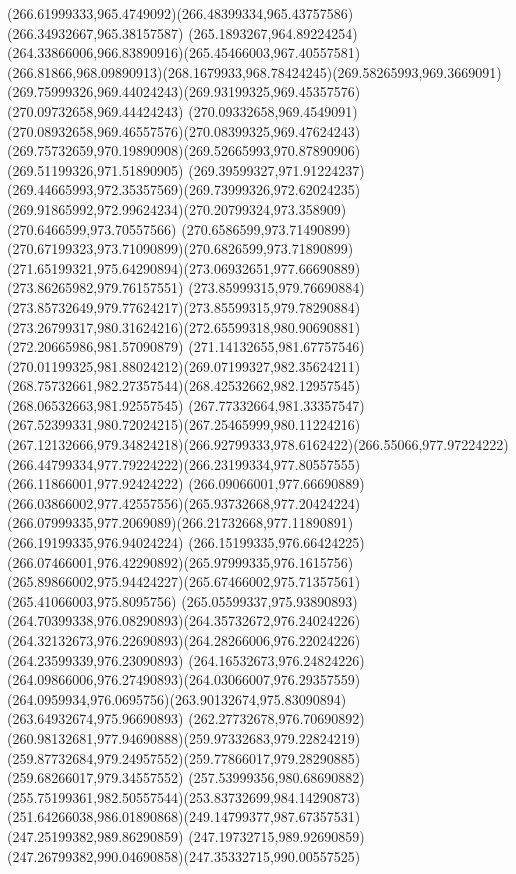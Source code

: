 {{\curveto(266.61999333,965.4749092)(266.48399334,965.43757586)(266.34932667,965.38157587)
\curveto(265.1893267,964.89224254)(264.33866006,966.83890916)(265.45466003,967.40557581)
\curveto(266.81866,968.09890913)(268.1679933,968.78424245)(269.58265993,969.3669091)
\curveto(269.75999326,969.44024243)(269.93199325,969.45357576)(270.09732658,969.44424243)
\curveto(270.09332658,969.4549091)(270.08932658,969.46557576)(270.08399325,969.47624243)
\curveto(269.75732659,970.19890908)(269.52665993,970.87890906)(269.51199326,971.51890905)
\curveto(269.39599327,971.91224237)(269.44665993,972.35357569)(269.73999326,972.62024235)
\curveto(269.91865992,972.99624234)(270.20799324,973.358909)(270.6466599,973.70557566)
\curveto(270.6586599,973.71490899)(270.67199323,973.71090899)(270.6826599,973.71890899)
\curveto(271.65199321,975.64290894)(273.06932651,977.66690889)(273.86265982,979.76157551)
\curveto(273.85999315,979.76690884)(273.85732649,979.77624217)(273.85599315,979.78290884)
\curveto(273.26799317,980.31624216)(272.65599318,980.90690881)(272.20665986,981.57090879)
\curveto(271.14132655,981.67757546)(270.01199325,981.88024212)(269.07199327,982.35624211)
\curveto(268.75732661,982.27357544)(268.42532662,982.12957545)(268.06532663,981.92557545)
\curveto(267.77332664,981.33357547)(267.52399331,980.72024215)(267.25465999,980.11224216)
\curveto(267.12132666,979.34824218)(266.92799333,978.6162422)(266.55066,977.97224222)
\curveto(266.44799334,977.79224222)(266.23199334,977.80557555)(266.11866001,977.92424222)
\curveto(266.09066001,977.66690889)(266.03866002,977.42557556)(265.93732668,977.20424224)
\curveto(266.07999335,977.2069089)(266.21732668,977.11890891)(266.19199335,976.94024224)
\curveto(266.15199335,976.66424225)(266.07466001,976.42290892)(265.97999335,976.1615756)
\curveto(265.89866002,975.94424227)(265.67466002,975.71357561)(265.41066003,975.8095756)
\curveto(265.05599337,975.93890893)(264.70399338,976.08290893)(264.35732672,976.24024226)
\curveto(264.32132673,976.22690893)(264.28266006,976.22024226)(264.23599339,976.23090893)
\curveto(264.16532673,976.24824226)(264.09866006,976.27490893)(264.03066007,976.29357559)
\curveto(264.0959934,976.0695756)(263.90132674,975.83090894)(263.64932674,975.96690893)
\curveto(262.27732678,976.70690892)(260.98132681,977.94690888)(259.97332683,979.22824219)
\curveto(259.87732684,979.24957552)(259.77866017,979.28290885)(259.68266017,979.34557552)
\curveto(257.53999356,980.68690882)(255.75199361,982.50557544)(253.83732699,984.14290873)
\curveto(251.64266038,986.01890868)(249.14799377,987.67357531)(247.25199382,989.86290859)
\curveto(247.19732715,989.92690859)(247.26799382,990.04690858)(247.35332715,990.00557525)
}}
